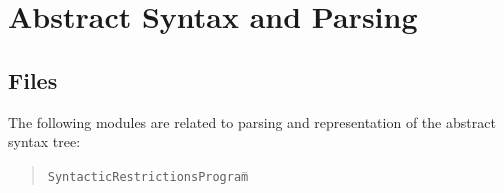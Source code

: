\documentclass[twoside,titlepage]{article}
\begin{document}
\section{Abstract Syntax and Parsing}
\label{parsing}

\subsection{Files}
\label{parsingfiles}

The following modules are related to parsing and representation of the abstract syntax tree:

\begin{quote}
\begin{tabbing}
{\tt SyntacticRestrictionsProgram}\qquad \= \kill


\end{tabbing}
\end{quote}
\end{document}
